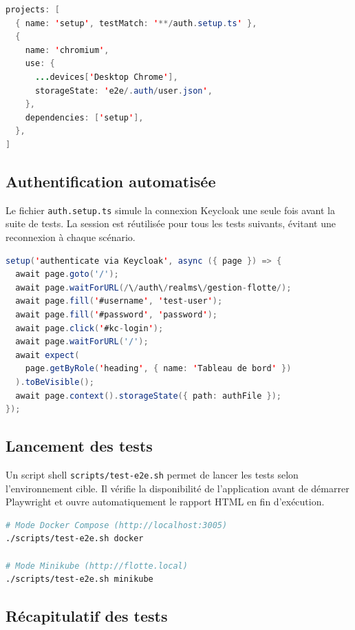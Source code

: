 \documentclass[12pt,a4paper]{article}
\begin{document}
\begin{lstlisting}[language=Java, caption=playwright.config.ts --- configuration des projets]
projects: [
  { name: 'setup', testMatch: '**/auth.setup.ts' },
  {
    name: 'chromium',
    use: {
      ...devices['Desktop Chrome'],
      storageState: 'e2e/.auth/user.json',
    },
    dependencies: ['setup'],
  },
]
\end{lstlisting}

\subsection{Authentification automatis\'{e}e}

Le fichier \texttt{auth.setup.ts} simule la connexion Keycloak une seule fois avant la suite de tests. La session est r\'{e}utilis\'{e}e pour tous les tests suivants, \'{e}vitant une reconnexion \`{a} chaque sc\'{e}nario.

\begin{lstlisting}[language=Java, caption=e2e/tests/auth.setup.ts]
setup('authenticate via Keycloak', async ({ page }) => {
  await page.goto('/');
  await page.waitForURL(/\/auth\/realms\/gestion-flotte/);
  await page.fill('#username', 'test-user');
  await page.fill('#password', 'password');
  await page.click('#kc-login');
  await page.waitForURL('/');
  await expect(
    page.getByRole('heading', { name: 'Tableau de bord' })
  ).toBeVisible();
  await page.context().storageState({ path: authFile });
});
\end{lstlisting}

\subsection{Lancement des tests}

Un script shell \texttt{scripts/test-e2e.sh} permet de lancer les tests selon l'environnement cible. Il v\'{e}rifie la disponibilit\'{e} de l'application avant de d\'{e}marrer Playwright et ouvre automatiquement le rapport HTML en fin d'ex\'{e}cution.

\begin{lstlisting}[language=bash, caption=Lancement des tests E2E]
# Mode Docker Compose (http://localhost:3005)
./scripts/test-e2e.sh docker

# Mode Minikube (http://flotte.local)
./scripts/test-e2e.sh minikube
\end{lstlisting}

\subsection{R\'{e}capitulatif des tests}
\end{document}
